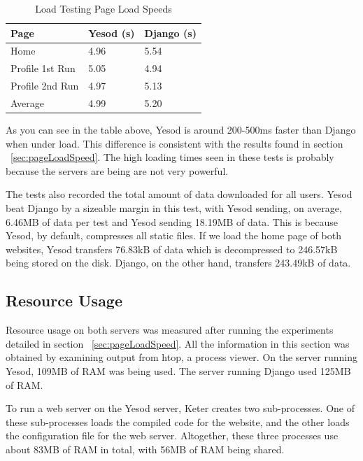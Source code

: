 \begin{table}[H]
	\caption{Load Testing Page Load Speeds}
	\begin{center}
		\begin{tabular}{ | l | l | l |}
			\hline
			Page & Yesod (s) & Django (s) \\
			\hline
			Home & 4.96 & 5.54 \\
			Profile 1st Run & 5.05 & 4.94 \\
			Profile 2nd Run & 4.97 & 5.13 \\
			Average & 4.99 & 5.20 \\
			\hline
		\end{tabular}
	\end{center}
	\label{tab:loadTests}
\end{table}

As you can see in the table above, Yesod is around 200-500ms faster than
Django when under load. This difference is consistent with the results
found in section ~\ref{sec:pageLoadSpeed}. The high loading times
seen in these tests is probably because the servers are being are not
very powerful.

The tests also recorded the total amount of data downloaded for all
users. Yesod beat Django by a sizeable margin in this test, with
Yesod sending, on average, 6.46MB of data per test and Yesod
sending 18.19MB of data. This is because Yesod, by default, compresses
all static files. If we load the home page of both websites, Yesod
transfers 76.83kB of data which is decompressed to 246.57kB being stored
on the disk. Django, on the other hand, transfers 243.49kB of data.

\subsection{Resource Usage}

Resource usage on both servers was measured after running the experiments
detailed in section ~\ref{sec:pageLoadSpeed}. All the information in 
this section was obtained by examining output from htop, a process viewer. 
On the server running Yesod, 109MB of RAM was being used. The server running 
Django used 125MB of RAM.

To run a web server on the Yesod server, Keter creates two sub-processes.
One of these sub-processes loads the compiled code for the website, and the
other loads the configuration file for the web server. Altogether, these
three processes use about 83MB of RAM in total, with 56MB of RAM being
shared.

